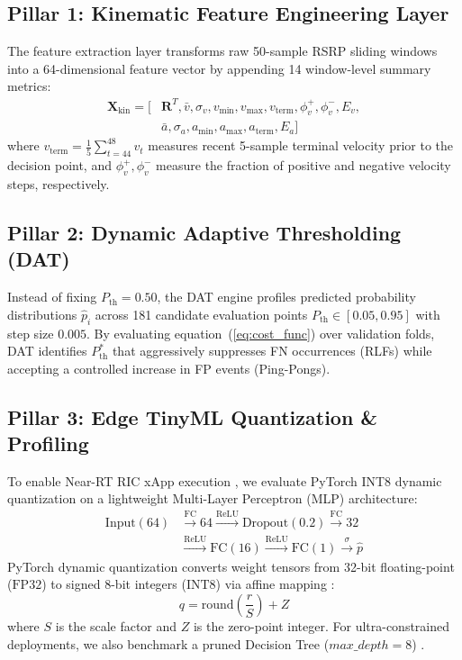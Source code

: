 \documentclass[conference]{IEEEtran}
\begin{document}
\subsection{Pillar 1: Kinematic Feature Engineering Layer}
The feature extraction layer transforms raw 50-sample RSRP sliding windows into a 64-dimensional feature vector by appending 14 window-level summary metrics:
\begin{equation}
\begin{aligned}
\mathbf{X}_{\text{kin}} = [&\mathbf{R}^T, \bar{v}, \sigma_v, v_{\text{min}}, v_{\text{max}}, v_{\text{term}}, \phi_v^+, \phi_v^-, E_v, \\
&\bar{a}, \sigma_a, a_{\text{min}}, a_{\text{max}}, a_{\text{term}}, E_a]
\end{aligned}
\end{equation}
where $v_{\text{term}} = \frac{1}{5}\sum_{t=44}^{48} v_t$ measures recent 5-sample terminal velocity prior to the decision point, and $\phi_v^+, \phi_v^-$ measure the fraction of positive and negative velocity steps, respectively.

\subsection{Pillar 2: Dynamic Adaptive Thresholding (DAT)}
Instead of fixing $P_{\text{th}} = 0.50$, the DAT engine profiles predicted probability distributions $\hat{p}_i$ across 181 candidate evaluation points $P_{\text{th}} \in [0.05, 0.95]$ with step size $0.005$. By evaluating equation~(\ref{eq:cost_func}) over validation folds, DAT identifies $P_{\text{th}}^*$ that aggressively suppresses FN occurrences (RLFs) while accepting a controlled increase in FP events (Ping-Pongs).

\subsection{Pillar 3: Edge TinyML Quantization \& Profiling}
To enable Near-RT RIC xApp execution \cite{tinyml_wireless_ray, quantization_survey_gholami}, we evaluate PyTorch INT8 dynamic quantization on a lightweight Multi-Layer Perceptron (MLP) architecture:
\begin{equation}
\begin{aligned}
\text{Input}(64) &\xrightarrow{\text{FC}} 64 \xrightarrow{\text{ReLU}} \text{Dropout}(0.2) \xrightarrow{\text{FC}} 32 \\
&\xrightarrow{\text{ReLU}} \text{FC}(16) \xrightarrow{\text{ReLU}} \text{FC}(1) \xrightarrow{\sigma} \hat{p}
\end{aligned}
\end{equation}
PyTorch dynamic quantization converts weight tensors from 32-bit floating-point ($\text{FP32}$) to signed 8-bit integers ($\text{INT8}$) via affine mapping \cite{quantization_survey_gholami}:
\begin{equation}
q = \text{round}\left(\frac{r}{S}\right) + Z
\end{equation}
where $S$ is the scale factor and $Z$ is the zero-point integer. For ultra-constrained deployments, we also benchmark a pruned Decision Tree ($max\_depth = 8$) \cite{pruned_trees_dinh}.
\end{document}
